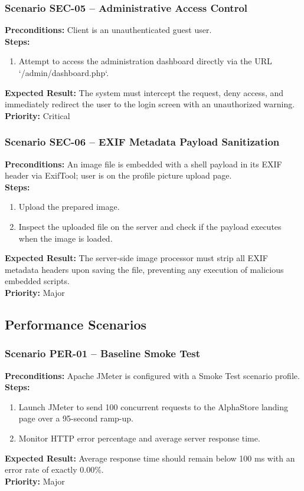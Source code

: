 \documentclass[12pt,a4paper]{article}
\begin{document}
\subsubsection*{Scenario SEC-05 – Administrative Access Control}
\textbf{Preconditions:} Client is an unauthenticated guest user.\\
\textbf{Steps:}
\begin{enumerate}
\item Attempt to access the administration dashboard directly via the URL `/admin/dashboard.php`.
\end{enumerate}
\textbf{Expected Result:} The system must intercept the request, deny access, and immediately redirect the user to the login screen with an unauthorized warning.\\
\textbf{Priority:} Critical

\subsubsection*{Scenario SEC-06 – EXIF Metadata Payload Sanitization}
\textbf{Preconditions:} An image file is embedded with a shell payload in its EXIF header via ExifTool; user is on the profile picture upload page.\\
\textbf{Steps:}
\begin{enumerate}
\item Upload the prepared image.
\item Inspect the uploaded file on the server and check if the payload executes when the image is loaded.
\end{enumerate}
\textbf{Expected Result:} The server-side image processor must strip all EXIF metadata headers upon saving the file, preventing any execution of malicious embedded scripts.\\
\textbf{Priority:} Major

\subsection{Performance Scenarios}

\subsubsection*{Scenario PER-01 – Baseline Smoke Test}
\textbf{Preconditions:} Apache JMeter is configured with a Smoke Test scenario profile.\\
\textbf{Steps:}
\begin{enumerate}
\item Launch JMeter to send 100 concurrent requests to the AlphaStore landing page over a 95-second ramp-up.
\item Monitor HTTP error percentage and average server response time.
\end{enumerate}
\textbf{Expected Result:} Average response time should remain below 100 ms with an error rate of exactly 0.00\%.\\
\textbf{Priority:} Major
\end{document}
